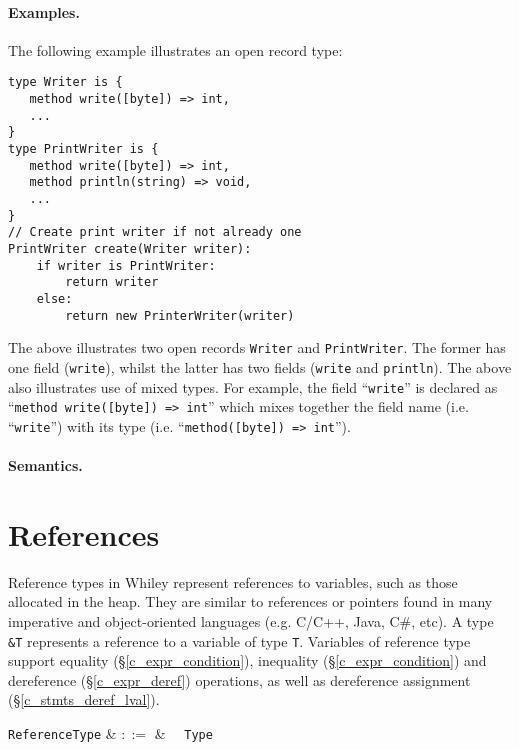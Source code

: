 \paragraph{Examples.}  The following example illustrates an open record type: 
\begin{lstlisting}
type Writer is { 
   method write([byte]) => int,
   ...
}
type PrintWriter is { 
   method write([byte]) => int,
   method println(string) => void,
   ...
}
// Create print writer if not already one
PrintWriter create(Writer writer):
    if writer is PrintWriter:
        return writer
    else:
        return new PrinterWriter(writer)
\end{lstlisting}
The above illustrates two open records \lstinline{Writer} and \lstinline{PrintWriter}.  The former has one field (\lstinline{write}), whilst the latter has two fields (\lstinline{write} and \lstinline{println}).  The above also illustrates use of mixed types.  For example, the field ``\lstinline{write}'' is declared as ``\lstinline{method write([byte]) => int}'' which mixes together the field name (i.e. ``\lstinline{write}'') with its type (i.e. ``\lstinline{method([byte]) => int}'').

\paragraph{Semantics.}


\section{References}

Reference types in Whiley represent references to variables, such as those allocated in the heap.  They are similar to references or pointers found in many imperative and object-oriented languages (e.g. C/C++, Java, C\#, etc).  A type \lstinline{&T} represents a reference to a variable of type \lstinline{T}.  Variables of reference type support equality (\S\ref{c_expr_condition}), inequality (\S\ref{c_expr_condition}) and dereference (\S\ref{c_expr_deref}) operations, as well as dereference assignment (\S\ref{c_stmts_deref_lval}).

\begin{syntax}
  \verb+ReferenceType+ & $::=$ & \token{\&}\ \ \verb+Type+\\
\end{syntax}


